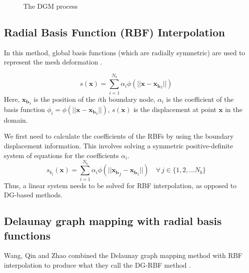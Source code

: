 \documentclass{article}
\begin{document}
\begin{figure}
{	}
	\caption{The DGM process}
\end{figure}

 

\subsection{Radial Basis Function (RBF) Interpolation}
In this method, global basis functions (which are radially symmetric) are used to represent the mesh deformation \cite{rbf}.

\begin{equation}
s(\mathbf{x}) = \sum_{i=1}^{N_b} \alpha_i \phi(||\mathbf{x}-\mathbf{x_{b}}_i||)
\end{equation}
Here, $\mathbf{x_{b}}_i$ is the position of the $i$th boundary node, $\alpha_i$ is the coefficient of the basis function $\phi_i = \phi(||\mathbf{x}-\mathbf{x_{b}}_i||)$, $s(\mathbf{x})$ is the displacement at point $\mathbf{x}$ in the domain.

We first need to calculate the coefficients of the RBFs by using the boundary displacement information. This involves solving a symmetric positive-definite system of equations for the coefficients $\alpha_i$.
\begin{equation}
s_{b_j}(\mathbf{x}) = \sum_{i=1}^{N_b} \alpha_i \phi(||\mathbf{x_{b}}_j-\mathbf{x_{b}}_i||) \quad \forall \, j \in \{1,2,...N_b \}
\end{equation}
Thus, a linear system needs to be solved for RBF interpolation, as opposed to DG-based methods.
 

\subsection{Delaunay graph mapping with radial basis functions}
Wang, Qin and Zhao combined the Delaunay graph mapping method with RBF interpolation to produce what they call the DG-RBF method \cite{dgrbf}.
\end{document}

